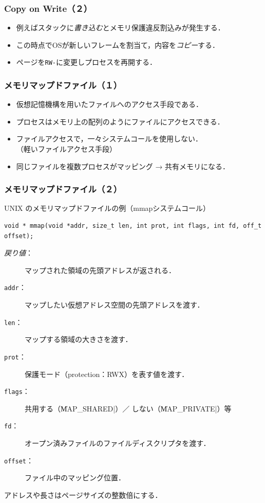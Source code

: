 \documentclass[unicode,handout]{beamer}                   %
\begin{document}
\begin{frame}
  \frametitle{Copy on Write（２）}
  \begin{itemize}
  \item 例えばスタックに\emph{書き込む}とメモリ保護違反割込みが発生する．
  \item この時点でOSが新しいフレームを割当て，内容を\emph{コピー}する．
  \item ページを\texttt{RW-}に変更しプロセスを再開する．
  \end{itemize}
\end{frame}

\begin{frame}
  \frametitle{メモリマップドファイル（１）}
  \begin{itemize}
  \item 仮想記憶機構を用いたファイルへのアクセス手段である．
  \item プロセスはメモリ上の配列のようにファイルにアクセスできる．
  \item ファイルアクセスで，一々システムコールを使用しない．\\
    （軽いファイルアクセス手段）
  \item 同じファイルを複数プロセスがマッピング → 共有メモリになる．
  \end{itemize}
\end{frame}

\begin{frame}[fragile]
  \frametitle{メモリマップドファイル（２）}
  UNIX のメモリマップドファイルの例（mmapシステムコール）

\begin{lstlisting}[numbers=none]
void * mmap(void *addr, size_t len, int prot, int flags, int fd, off_t offset);
\end{lstlisting}

  \begin{description}
  \item[\emph{戻り値}：] マップされた領域の先頭アドレスが返される．
  \item[\texttt{addr}：] マップしたい仮想アドレス空間の先頭アドレスを渡す．
  \item[\texttt{len}：] マップする領域の大きさを渡す．
  \item[\texttt{prot}：] 保護モード（protection：RWX）を表す値を渡す．
  \item[\texttt{flags}：]共用する（\|MAP_SHARED|）／
    しない（\|MAP_PRIVATE|）等
  \item[\texttt{fd}：] オープン済みファイルのファイルディスクリプタを渡す．
  \item[\texttt{offset}：] ファイル中のマッピング位置．
  \end{description}

  アドレスや長さはページサイズの整数倍にする．
\end{frame}
\end{document}
